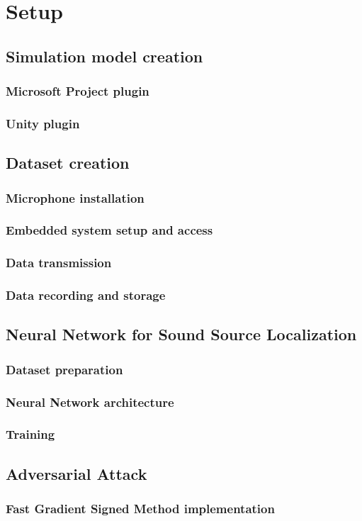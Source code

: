 \chapter{Setup}
\label{ch:setup}

\section{Simulation model creation}

\subsection{Microsoft Project plugin}

\subsection{Unity plugin}

\section{Dataset creation}

\subsection{Microphone installation}

\subsection{Embedded system setup and access}

\subsection{Data transmission}

\subsection{Data recording and storage}

\section{Neural Network for Sound Source Localization}

\subsection{Dataset preparation}

\subsection{Neural Network architecture}

\subsection{Training}

\section{Adversarial Attack}

\subsection{Fast Gradient Signed Method implementation}


